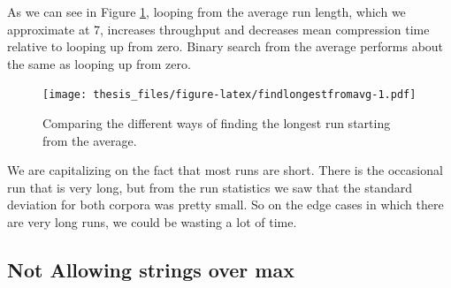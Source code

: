 \documentclass[12pt,twoside]{reedthesis}
\begin{document}
As we can see in Figure \ref{fig:findlongestfromavg}, looping from the average run length, which we approximate at 7, increases throughput and decreases mean compression time relative to looping up from zero. Binary search from the average performs about the same as looping up from zero.
\begin{figure}
\centering
\texttt{[image: thesis\_files/figure-latex/findlongestfromavg-1.pdf]}
\caption{\label{fig:findlongestfromavg}Comparing the different ways of finding the longest run starting from the average.}
\end{figure}
We are capitalizing on the fact that most runs are short. There is the occasional run that is very long, but from the run statistics we saw that the standard deviation for both corpora was pretty small. So on the edge cases in which there are very long runs, we could be wasting a lot of time.

\hypertarget{not-allowing-strings-over-max}{%
\subsection{Not Allowing strings over max}\label{not-allowing-strings-over-max}}
\end{document}
